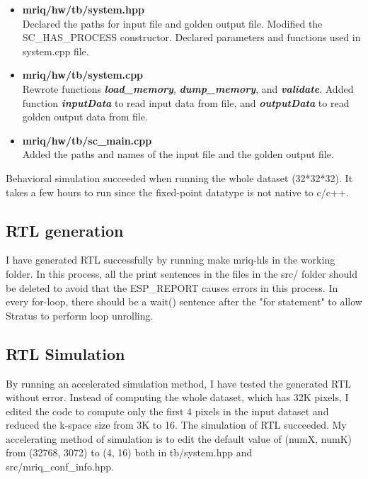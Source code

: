 \begin{itemize}
    \item \textbf{mriq/hw/tb/system.hpp} \\
    Declared the paths for input file and golden output file. Modified the SC\_HAS\_PROCESS constructor. Declared parameters and functions used in system.cpp file.

    \item \textbf{mriq/hw/tb/system.cpp} \\
    Rewrote functions \textbf{\textit{load\_memory}}, \textbf{\textit{dump\_memory}}, and \textbf{\textit{validate}}. Added function \textbf{\textit{inputData}} to read input data from file, and \textbf{\textit{outputData}} to read golden output data from file.

    \item \textbf{mriq/hw/tb/sc\_main.cpp} \\
    Added the paths and names of the input file and the golden output file.
\end{itemize}

Behavioral simulation succeeded when running the whole dataset (32*32*32). It takes a few hours to run since the fixed-point datatype is not native to c/c++. 

\subsection{RTL generation}
I have generated RTL successfully by running make mriq-hls in the working folder. In this process, all the print sentences in the files in the src/ folder should be deleted to avoid that the ESP\_REPORT causes errors in this process. In every for-loop, there should be a wait() sentence after the "for statement" to allow Stratus to perform loop unrolling.

\subsection{RTL Simulation}
By running an accelerated simulation method, I have tested the generated RTL without error. Instead of computing the whole dataset, which has 32K pixels, I edited the code to compute only the first 4 pixels in the input dataset and reduced the k-space size from 3K to 16. The simulation of RTL succeeded. My accelerating method of simulation is to edit the default value of (numX, numK) from (32768, 3072) to (4, 16) both in tb/system.hpp and src/mriq\_conf\_info.hpp. 

